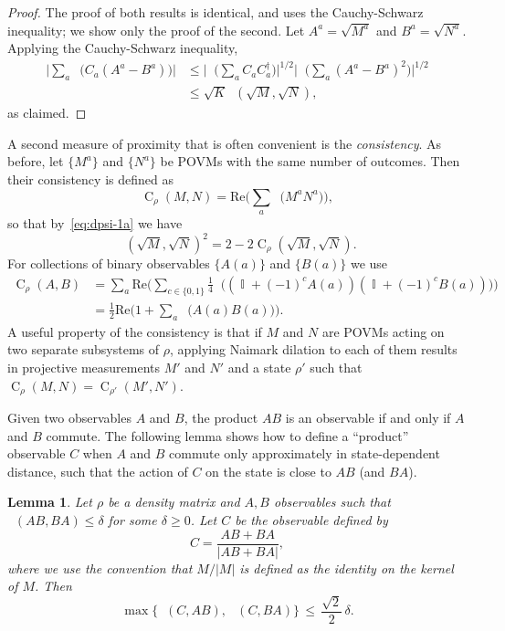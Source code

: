 \documentclass[11pt,letterpaper]{article}
\newcommand{\<}{\langle}
\renewcommand{\>}{\rangle}
\newtheorem{lemma}[theorem]{Lemma}
\newcommand{\bra}[1]{\< #1 |}
\newcommand{\ket}[1]{| #1 \>}
\DeclareMathOperator{\Id}{\mathbb{I}}
\DeclareMathOperator{\Tr}{Tr}
\DeclareMathOperator{\CON}{C}
\DeclareMathOperator{\DIS}{d}
\DeclareMathOperator{\Drho}{\DIS_\rho}
\DeclareMathOperator{\Trho}{\Tr_\rho}
\renewcommand{\Re}{\mathrm{Re}}
\begin{document}
\begin{proof}
The proof of both results is identical, and uses the Cauchy-Schwarz inequality;
we show only the proof of the second. Let $A^a = \sqrt{M^a}$ and $B^a = \sqrt{N^a}$. Applying the Cauchy-Schwarz inequality,
  \begin{align*}
    \Big|\sum_a \Trho\big( C_a (A^a - B^a) \big) \Big| 
    &\leq     \Big|\Trho\Big(\sum_a  C_aC_a^\dagger  \Big)\Big|^{1/2} \Big|\Trho\Big(\sum_a (A^a -      B^a)^2  \Big) \Big|^{1/2} \\
    &\leq \sqrt{K} \Drho(\sqrt{M}, \sqrt{N}),
  \end{align*}
	as claimed.
\end{proof}
A second measure of proximity that is often convenient is the
\emph{consistency}. As before, let $\{M^a\}$ and $\{N^a\}$ be POVMs
with the same number of outcomes. Then their consistency is defined
as
\[ \CON_\rho(M, N) = \Re \Big(\sum_a \Trho\big( M^a N^a \big)\Big), \]
so that by~\eqref{eq:dpsi-1a} we have 
\begin{equation} \label{eq:condist}\Drho(\sqrt{M}, \sqrt{N})^2 = 2-2
\CON_\rho(\sqrt{M},\sqrt{N}).\end{equation}
 For collections of binary observables $\{A(a)\}$ and $\{B(a)\}$ we use
\begin{align*}
 \CON_\rho(A,B) &= \sum_a \Re \Big( \sum_{c\in\{0,1\}} \frac{1}{4} \Trho \big( (\Id+(-1)^cA(a))(\Id+(-1)^c B(a) )\big)\Big)\\
&= \frac{1}{2}\Re \Big(1+\sum_a \Trho\big(A(a)B(a)\big)\Big).
\end{align*}
A useful property of the consistency is that if $M$ and $N$ are POVMs
acting on two separate subsystems of $\rho$, applying Naimark
dilation to each of them results in projective measurements $M'$ and
$N'$ and a state $\rho'$ such that $\CON_\rho(M, N) =
\CON_{\rho'}(M', N')$. 

Given two observables $A$ and $B$, the product $AB$ is an observable
if and only if $A$ and $B$ commute. The following lemma shows how to define
a ``product'' observable $C$ when $A$ and $B$ commute only
approximately in state-dependent distance, such that the action of $C$
on the state is close to $AB$ (and $BA$).
\begin{lemma}
  Let $\rho$ be a density matrix and $A, B$ observables such that
  $\Drho(AB,BA) \leq \delta$ for some $\delta\geq 0$. Let $C$ be the observable defined by
  \[ C = \frac{AB + BA}{|AB + BA|} , \]
	 where we use the convention
  that $M/ |M|$ is defined as the identity on the kernel of $M$. Then
  $$\max\Big\{ \Drho(C,AB),\,\Drho(C,BA)\Big\}\, \leq\, \frac{\sqrt{2}}{2}\,\delta.$$
  \label{lem:jointobs}
\end{lemma}
\end{document}
